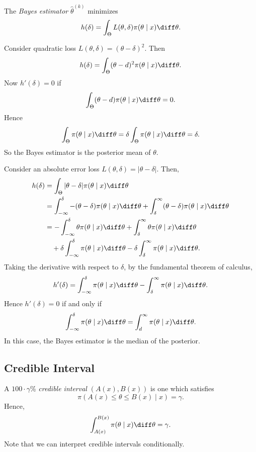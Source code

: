 \documentclass[12pt]{article}
\begin{document}
The \emph{Bayes estimator} $\hat \theta^{(k)}$ minimizes
\[
h(\delta) = \int_{\Theta} L(\theta, \delta) \pi(\theta \mid x) \diff \theta
.\]

\begin{exbox}
	Consider quadratic loss $L(\theta, \delta) = (\theta - \delta)^2$. Then
	\[
	h(\delta) = \int_{\Theta}(\theta - d)^2 \pi(\theta \mid x) \diff \theta
	.\]
	Now $h'(\delta) = 0$ if
	\[
	\int_{\Theta} (\theta - d) \pi(\theta \mid x) \diff \theta = 0
	.\]
	Hence
	\[
	\int_{\Theta}\pi(\theta \mid x) \diff \theta = \delta \int_{\Theta} \pi(\theta \mid x) \diff \theta = \delta
	.\]
	So the Bayes estimator is the posterior mean of $\theta$.
\end{exbox}

\begin{exbox}
	Consider an absolute error loss $L(\theta, \delta) = |\theta - \delta|$. Then,
	\begin{align*}
		h(\delta) &= \int_{\Theta} |\theta - \delta| \pi(\theta \mid x) \diff \theta \\
			  &= \int_{-\infty}^{\delta}-(\theta - \delta) \pi(\theta \mid x) \diff \theta + \int_{\delta}^{\infty}(\theta - \delta) \pi(\theta \mid x) \diff \theta \\
			  &= - \int_{-\infty}^{\delta} \theta \pi(\theta \mid x) \diff \theta + \int_{\delta}^{\infty} \theta \pi(\theta \mid x) \diff \theta \\
			  &\quad{} + \delta \int_{-\infty}^{\delta} \pi(\theta \mid x) \diff \theta - \delta \int_{\delta}^{\infty} \pi(\theta \mid x) \diff \theta.
	\end{align*}
	Taking the derivative with respect to $\delta$, by the fundamental theorem of calculus,
	\[
	h'(\delta) = \int_{-\infty}^{\delta} \pi(\theta \mid x) \diff \theta - \int_{\delta}^{\infty} \pi(\theta \mid x) \diff \theta
	.\]
	Hence $h'(\delta) = 0$ if and only if
	\[
	\int_{-\infty}^{\delta} \pi(\theta \mid x) \diff \theta = \int_{d}^{\infty} \pi(\theta \mid x) \diff \theta
	.\]
	In this case, the Bayes estimator is the median of the posterior.
\end{exbox}

\subsection{Credible Interval}
\label{sub:credible_interval}

A $100 \cdot \gamma$\% \emph{credible interval} $(A(x), B(x))$ is one which satisfies
\[
\pi(A(x) \leq \theta \leq B(x) \mid x) = \gamma
.\]
Hence,
\[
\int_{A(x)}^{B(x)} \pi(\theta \mid x) \diff \theta = \gamma
.\]
Note that we can interpret credible intervals conditionally.
\end{document}
